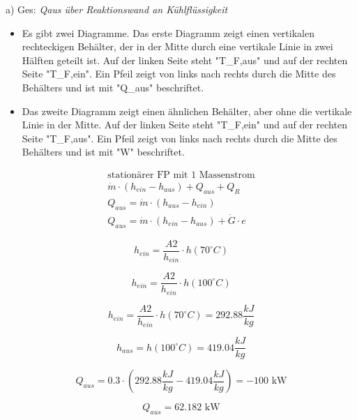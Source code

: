 a) Ges: \textit{Qaus über Reaktionswand an Kühlflüssigkeit}

\begin{itemize}
    \item Es gibt zwei Diagramme. Das erste Diagramm zeigt einen vertikalen rechteckigen Behälter, der in der Mitte durch eine vertikale Linie in zwei Hälften geteilt ist. Auf der linken Seite steht "T_{F,aus}" und auf der rechten Seite "T_{F,ein}". Ein Pfeil zeigt von links nach rechts durch die Mitte des Behälters und ist mit "Q_{aus}" beschriftet.
    \item Das zweite Diagramm zeigt einen ähnlichen Behälter, aber ohne die vertikale Linie in der Mitte. Auf der linken Seite steht "T_{F,ein}" und auf der rechten Seite "T_{F,aus}". Ein Pfeil zeigt von links nach rechts durch die Mitte des Behälters und ist mit "W" beschriftet.
\end{itemize}

\begin{align*}
    \text{stationärer FP mit 1 Massenstrom} \\
    \dot{m} \cdot (h_{ein} - h_{aus}) + Q_{aus} + Q_R \\
    Q_{aus} = \dot{m} \cdot (h_{aus} - h_{ein}) \\
    Q_{aus} = \dot{m} \cdot (h_{ein} - h_{aus}) + \dot{G} \cdot e
\end{align*}

\[
h_{ein} = \frac{A2}{h_{ein}} \cdot h(70^\circ C)
\]

\[
h_{ein} = \frac{A2}{h_{ein}} \cdot h(100^\circ C)
\]

\[
h_{ein} = \frac{A2}{h_{ein}} \cdot h(70^\circ C) = 292.88 \frac{kJ}{kg}
\]

\[
h_{aus} = h(100^\circ C) = 419.04 \frac{kJ}{kg}
\]

\[
Q_{aus} = 0.3 \cdot (292.88 \frac{kJ}{kg} - 419.04 \frac{kJ}{kg}) = -100 \text{ kW}
\]

\[
Q_{aus} = 62.182 \text{ kW}
\]